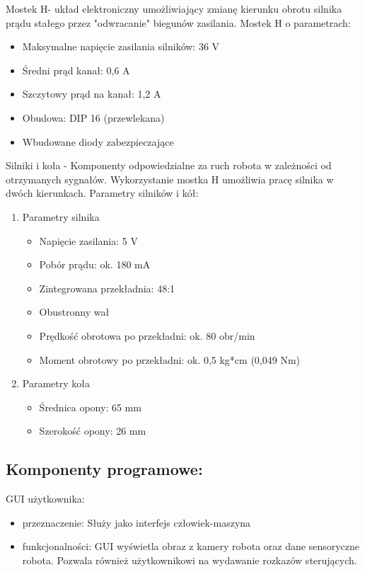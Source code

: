 \documentclass[a4paper]{article}
\begin{document}
Mostek H- układ elektroniczny umożliwiający zmianę kierunku obrotu silnika prądu stałego przez "odwracanie" biegunów zasilania. Mostek H o parametrach:
\begin{itemize}
\item Maksymalne napięcie zasilania silników: 36 V
\item Średni prąd kanał: 0,6 A
\item Szczytowy prąd na kanał: 1,2 A
\item Obudowa: DIP 16 (przewlekana)
\item Wbudowane diody zabezpieczające
\end{itemize}
Silniki i koła - Komponenty odpowiedzialne za ruch robota w zależności od otrzymanych sygnałów.
Wykorzystanie mostka H umożliwia pracę silnika w dwóch kierunkach. Parametry silników i kół:

\begin{enumerate}
\item Parametry silnika
\begin{itemize}
\item Napięcie zasilania: 5 V
\item Pobór prądu: ok. 180 mA
\item Zintegrowana przekładnia: 48:1
\item Obustronny wał
\item Prędkość obrotowa po przekładni: ok. 80 obr/min
\item Moment obrotowy po przekładni: ok. 0,5 kg*cm (0,049 Nm)
\end{itemize}

\item Parametry koła
\begin{itemize}
\item Średnica opony: 65 mm
\item Szerokość opony: 26 mm
\end{itemize}
\end{enumerate}

\subsection{Komponenty programowe:}
GUI użytkownika:
\begin{itemize}
\item przeznaczenie: Służy jako interfejs człowiek-maszyna
\item funkcjonalności: GUI wyświetla obraz z kamery robota oraz dane sensoryczne robota. Pozwala również użytkownikowi na wydawanie rozkazów sterujących. 
\end{itemize}
\end{document}
